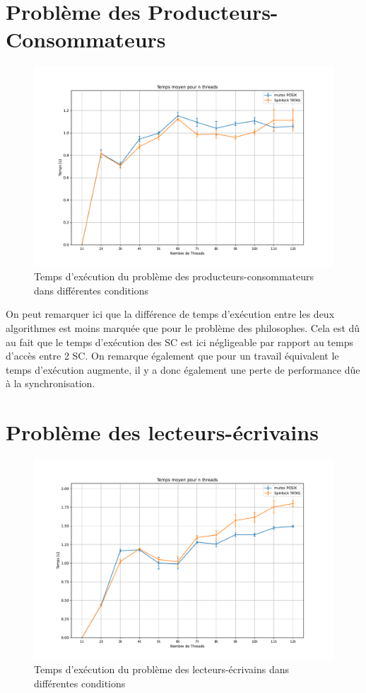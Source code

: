 \section{Problème des Producteurs-Consommateurs}

\begin{figure}[h!]
    \centering
    \includegraphics[scale=0.45]{img/prodcons.pdf}
    \caption{Temps d'exécution du problème des producteurs-consommateurs dans différentes conditions}
    \label{pic:prodcons}
\end{figure}

\noindent On peut remarquer ici que la différence de temps d'exécution entre les deux algorithmes est moins marquée que pour le problème des philosophes. Cela est dû au fait que 
le temps d'exécution des SC est ici négligeable par rapport au temps d'accès entre 2 SC. 
On remarque également que pour un travail équivalent le temps d'exécution augmente, il y a donc également une perte de performance dûe à la synchronisation.

\section{Problème des lecteurs-écrivains}



\begin{figure}[h!]
    \centering
    \includegraphics[scale=0.45]{img/readwrt.pdf}
    \caption{Temps d'exécution du problème des lecteurs-écrivains dans différentes conditions}
    \label{pic:readwrt}
\end{figure}

